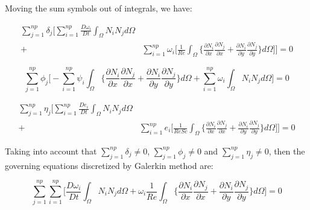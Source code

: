 \medksip
\noindent
Moving the sum symbols out of integrals, we have:

\begin{equation}
 \begin{aligned} 
  \sum\limits_{j=1}^{np} \delta_j \Bigg[
  \sum\limits_{i=1}^{np} \frac{D \omega_i}{Dt} 
  \int_{\Omega} N_i N_j d\Omega & 
  \\[5pt]
   + & \sum\limits_{i=1}^{np} \omega_i \Bigg[
   \frac{1}{\textit{Re}}
   \int_{\Omega} \Bigg\{ 
   \frac{\partial N_i}{\partial x} 
   \frac{\partial N_j}{\partial x} 
   + 
   \frac{\partial N_i}{\partial y} 
   \frac{\partial N_j}{\partial y} 
   \Bigg\} d\Omega
 \Bigg] \Bigg] = 0
 \end{aligned}
\end{equation}

\begin{equation}
  \sum\limits_{j=1}^{np} \phi_j \Bigg[
  - \sum\limits_{i=1}^{np} \psi_i 
   \int_{\Omega} \Bigg\{ 
                  \frac{\partial N_i}{\partial x} 
                  \frac{\partial N_j}{\partial x} 
  +               \frac{\partial N_i}{\partial y} 
                  \frac{\partial N_j}{\partial y} 
  \Bigg\} d\Omega
  + \sum\limits_{i=1}^{np} \omega_i 
   \int_{\Omega} N_i N_j d\Omega
  \Bigg] = 0
\end{equation}

\begin{equation}
 \begin{aligned} 
  \sum\limits_{j=1}^{np} \eta_j \Bigg[
  \sum\limits_{i=1}^{np} \frac{D e_i}{Dt} 
  \int_{\Omega} N_i N_j d\Omega & 
  \\[5pt]
   + & \sum\limits_{i=1}^{np} e_i \Bigg[
   \frac{1}{\textit{ReSc}} 
   \int_{\Omega} \Bigg\{ 
   \frac{\partial N_i}{\partial x} 
   \frac{\partial N_j}{\partial x} 
   + 
   \frac{\partial N_i}{\partial y} 
   \frac{\partial N_j}{\partial y} 
   \Bigg\} d\Omega
 \Bigg] \Bigg] = 0
 \end{aligned}
\end{equation}


\noindent
Taking into account that
$\sum\limits_{j=1}^{np} \delta_j \neq 0$,
$\sum\limits_{j=1}^{np} \phi_j \neq 0$ and
$\sum\limits_{j=1}^{np} \eta_j \neq 0$,
then the governing equations discretized
by Galerkin method are:

\begin{equation} \label{vorticity galerkin}
  \sum\limits_{j=1}^{np}
  \sum\limits_{i=1}^{np} \Bigg[ \frac{D \omega_i}{Dt} 
  \int_{\Omega} N_i N_j d\Omega 
   + \omega_i
   \frac{1}{\textit{Re}}
   \int_{\Omega} \Bigg\{ 
   \frac{\partial N_i}{\partial x} 
   \frac{\partial N_j}{\partial x} 
   + 
   \frac{\partial N_i}{\partial y} 
   \frac{\partial N_j}{\partial y} 
   \Bigg\} d\Omega
 \Bigg] = 0
\end{equation}

